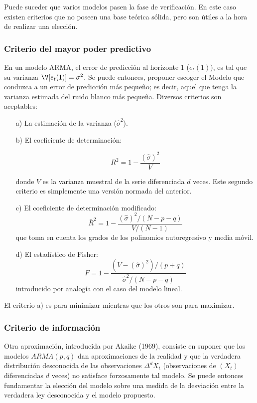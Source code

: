 Puede suceder que varios modelos pasen la fase de verificaci\'{o}n. En este caso existen criterios que no poseen una base te\'{o}rica s\'{o}lida, pero son \'{u}tiles a la hora de realizar una elecci\'{o}n.

\subsubsection{Criterio del mayor poder predictivo}

En un modelo ARMA, el error de predicci\'{o}n al horizonte 1 ($e_{t}(1)$), es tal que su varianza $\V[e_{t}(1)]=\sigma^{2}$. Se puede entonces, proponer escoger el Modelo que conduzca a un error de predicci\'{o}n m\'{a}s peque\~{n}o; es decir, aquel que tenga la varianza estimada del ruido blanco m\'{a}s peque\~{n}a. Diversos criterios son aceptables:

\begin{enumerate}
\item[a)] La estimaci\'{o}n de la varianza ($\widehat{\sigma }^{2}$).
\item[b)] El coeficiente de determinaci\'{o}n:

\[
R^{2}=1-\frac{(\widehat{\sigma} )^{2}}{V}
\]

donde $V$ es la varianza muestral de la serie diferenciada $d$ veces. Este segundo criterio es simplemente una versi\'{o}n normada del anterior.

\item[c)] El coeficiente de determinaci\'{o}n modificado:
\[
\bar{R}^{2}=1-\frac{(\widehat{\sigma})^{2}/(N-p-q)}{V/(N-1)}
\]
que toma en cuenta los grados de los polinomios autoregresivo y media m\'{o}vil.

\item[d)] El estad\'{i}stico de Fisher:
\[
F=1-\frac{(V-(\widehat{\sigma} )^{2})/(p+q)}{\widehat{\sigma} ^{2}/(N-p-q)}
\]
introducido por analog\'{i}a con el caso del modelo lineal. 
\end{enumerate}

El criterio a) es para minimizar mientras que los otros son para maximizar.


\subsubsection{Criterio de informaci\'{o}n}

Otra aproximaci\'{o}n, introducida por Akaike (1969), consiste en suponer que los modelos $ARMA  (p,q)$ dan aproximaciones de la realidad y que la verdadera distribuci\'{o}n desconocida de las observaciones ${\Delta }^{d}X_{t}$ (observaciones de $\left( X_{t} \right)$ diferenciadas $d$ veces) no satisface forzosamente tal modelo. Se puede entonces fundamentar la elecci\'{o}n del modelo sobre una medida de la desviaci\'{o}n entre la verdadera ley desconocida y el modelo propuesto.\newline

